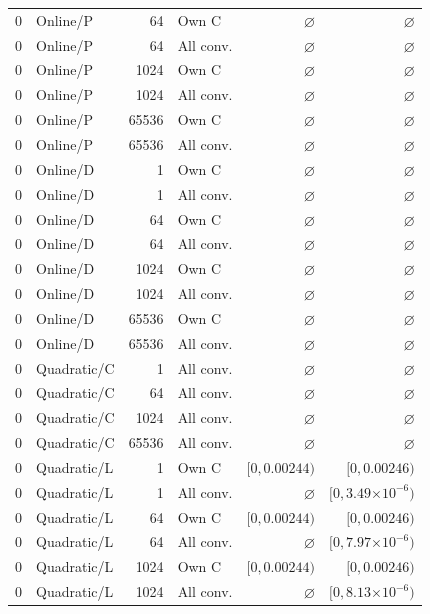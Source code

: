 \begin{longtable}{llrlrr}
0 & Online/P & 64 & Own C & $\varnothing$ & $\varnothing$ \\
0 & Online/P & 64 & All conv. & $\varnothing$ & $\varnothing$ \\
0 & Online/P & 1024 & Own C & $\varnothing$ & $\varnothing$ \\
0 & Online/P & 1024 & All conv. & $\varnothing$ & $\varnothing$ \\
0 & Online/P & 65536 & Own C & $\varnothing$ & $\varnothing$ \\
0 & Online/P & 65536 & All conv. & $\varnothing$ & $\varnothing$ \\
0 & Online/D & 1 & Own C & $\varnothing$ & $\varnothing$ \\
0 & Online/D & 1 & All conv. & $\varnothing$ & $\varnothing$ \\
0 & Online/D & 64 & Own C & $\varnothing$ & $\varnothing$ \\
0 & Online/D & 64 & All conv. & $\varnothing$ & $\varnothing$ \\
0 & Online/D & 1024 & Own C & $\varnothing$ & $\varnothing$ \\
0 & Online/D & 1024 & All conv. & $\varnothing$ & $\varnothing$ \\
0 & Online/D & 65536 & Own C & $\varnothing$ & $\varnothing$ \\
0 & Online/D & 65536 & All conv. & $\varnothing$ & $\varnothing$ \\
0 & Quadratic/C & 1 & All conv. & $\varnothing$ & $\varnothing$ \\
0 & Quadratic/C & 64 & All conv. & $\varnothing$ & $\varnothing$ \\
0 & Quadratic/C & 1024 & All conv. & $\varnothing$ & $\varnothing$ \\
0 & Quadratic/C & 65536 & All conv. & $\varnothing$ & $\varnothing$ \\
0 & Quadratic/L & 1 & Own C & $[0, 0.00244)$ & $[0, 0.00246)$ \\
0 & Quadratic/L & 1 & All conv. & $\varnothing$ & $[0, 3.49\mathord{\times}10^{-6})$ \\
0 & Quadratic/L & 64 & Own C & $[0, 0.00244)$ & $[0, 0.00246)$ \\
0 & Quadratic/L & 64 & All conv. & $\varnothing$ & $[0, 7.97\mathord{\times}10^{-6})$ \\
0 & Quadratic/L & 1024 & Own C & $[0, 0.00244)$ & $[0, 0.00246)$ \\
0 & Quadratic/L & 1024 & All conv. & $\varnothing$ & $[0, 8.13\mathord{\times}10^{-6})$ \\

\end{longtable}
